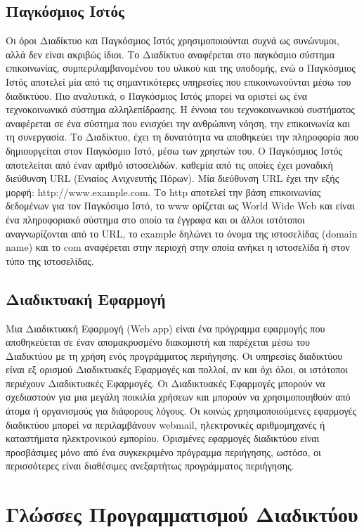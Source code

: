 \subsection{Παγκόσμιος Ιστός}
Οι όροι Διαδίκτυο και Παγκόσμιος Ιστός χρησιμοποιούνται συχνά ως συνώνυμοι, αλλά δεν είναι ακριβώς ίδιοι. Το Διαδίκτυο αναφέρεται στο παγκόσμιο σύστημα επικοινωνίας, συμπεριλαμβανομένου του υλικού και της υποδομής, ενώ ο Παγκόσμιος Ιστός αποτελεί μία από τις σημαντικότερες υπηρεσίες που επικοινωνούνται μέσω του διαδικτύου. Πιο αναλυτικά, ο Παγκόσμιος Ιστός μπορεί να οριστεί ως ένα τεχνοκοινωνικό σύστημα αλληλεπίδρασης. Η έννοια του τεχνοκοινωνικού συστήματος αναφέρεται σε ένα σύστημα που ενισχύει την ανθρώπινη νόηση, την επικοινωνία και τη συνεργασία. Το Διαδίκτυο, έχει τη δυνατότητα να αποθηκεύει την πληροφορία που δημιουργείται στον Παγκόσμιο Ιστό, μέσω των χρηστών του. Ο Παγκόσμιος Ιστός αποτελείται από έναν αριθμό ιστοσελιδών. καθεμία από τις οποίες έχει μοναδική διεύθυνση URL (Ενιαίος Ανιχνευτής Πόρων). Μία διεύθυνση URL έχει την εξής μορφή: http://www.example.com. Το http αποτελεί την βάση επικοινωνίας δεδομένων για τον Παγκόσιμο Ιστό, το www ορίζεται ως World Wide Web και είναι ένα πληροφοριακό σύστημα στο οποίο τα έγγραφα και οι άλλοι ιστότοποι αναγνωρίζονται από το URL, το example δηλώνει το όνομα της ιστοσελίδας (domain name) και το com αναφέρεται στην περιοχή στην οποία ανήκει η ιστοσελίδα ή στον τύπο της ιστοσελίδας.

\subsection{Διαδικτυακή Εφαρμογή}
Μια Διαδικτυακή Εφαρμογή (Web app) είναι ένα πρόγραμμα εφαρμογής που αποθηκεύεται σε έναν απομακρυσμένο διακομιστή και παρέχεται μέσω του Διαδικτύου με τη χρήση ενός προγράμματος περιήγησης. Οι υπηρεσίες διαδικτύου είναι εξ ορισμού Διαδικτυακές Εφαρμογές και πολλοί, αν και όχι όλοι, οι ιστότοποι περιέχουν Διαδικτυακές Εφαρμογές.
Οι Διαδικτυακές Εφαρμογές μπορούν να σχεδιαστούν για μια μεγάλη ποικιλία χρήσεων και μπορούν να χρησιμοποιηθούν από άτομα ή οργανισμούς για διάφορους λόγους. Οι κοινώς χρησιμοποιούμενες εφαρμογές διαδικτύου μπορεί να περιλαμβάνουν webmail, ηλεκτρονικές αριθμομηχανές ή καταστήματα ηλεκτρονικού εμπορίου. Ορισμένες εφαρμογές διαδικτύου είναι προσβάσιμες μόνο από ένα συγκεκριμένο πρόγραμμα περιήγησης, ωστόσο, οι περισσότερες είναι διαθέσιμες ανεξαρτήτως προγράμματος περιήγησης.

\section{Γλώσσες Προγραμματισμού Διαδικτύου}

